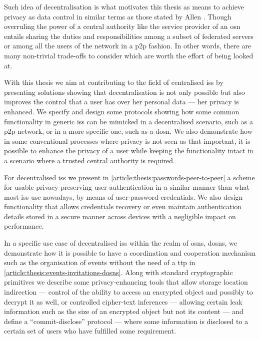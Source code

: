 Such idea of decentralisation is what motivates this thesis as means to achieve 
privacy as data control in similar terms as those stated by Allen \cite{Allen99}. 
Though overruling the power of a central authority like the service provider of 
an \ac{osn} entails sharing the duties and responsibilities among a subset of federated 
servers or among all the users of the network in a \ac{p2p} fashion. In other words, 
there are many non-trivial trade-offs to consider which are worth the effort of 
being looked at.

With this thesis we aim at contributing to the field of centralised \acp{is} by 
presenting solutions showing that decentralisation is not only possible but also 
improves the control that a user has over her personal data --- her privacy is enhanced. 
We specify and design some protocols showing how some common functionality in 
generic \acp{is} can be mimicked in a decentralised scenario, such as a \ac{p2p} 
network, or in a more specific one, such as a \ac{dosn}. We also demonstrate how 
in some conventional processes where privacy is not seen as that important, it is 
possible to enhance the privacy of a user while keeping the functionality intact 
in a scenario where a trusted central authority is required.

For decentralised \acp{is} we present in \cref{article:thesis:passwords-peer-to-peer} 
a scheme for usable privacy-preserving user authentication in a similar manner than 
what most \acp{is} use nowadays, by means of user-password credentials. We also 
design functionality that allows credentials recovery or even maintain authentication 
details stored in a secure manner across devices with a negligible impact on performance.

In a specific use case of decentralised \acp{is} within the realm of \acp{osn}, 
\acp{dosn}, we demonstrate how it is possible to have a coordination and cooperation 
mechanism such as the organisation of events without the need of a \ac{ttp} in \cref{article:thesis:events-invitations-dosns}. 
Along with standard cryptographic primitives we describe some privacy-enhancing 
tools that allow storage location indirection --- control of the ability to access 
an encrypted object and possibly to decrypt it as well, or controlled cipher-text 
inferences --- allowing certain leak information such as the size of an encrypted 
object but not its content --- and define a ``commit-disclose'' protocol --- where 
some information is disclosed to a certain set of users who have fulfilled some 
requirement.

